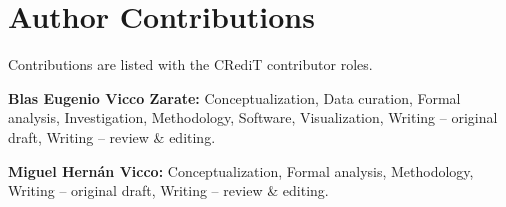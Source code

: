 \section*{Author Contributions}

Contributions are listed with the CRediT contributor roles.

\noindent\textbf{Blas Eugenio Vicco Zarate:} Conceptualization, Data curation, Formal analysis, Investigation, Methodology, Software, Visualization, Writing -- original draft, Writing -- review \& editing.

\noindent\textbf{Miguel Hern\'an Vicco:} Conceptualization, Formal analysis, Methodology, Writing -- original draft, Writing -- review \& editing.
